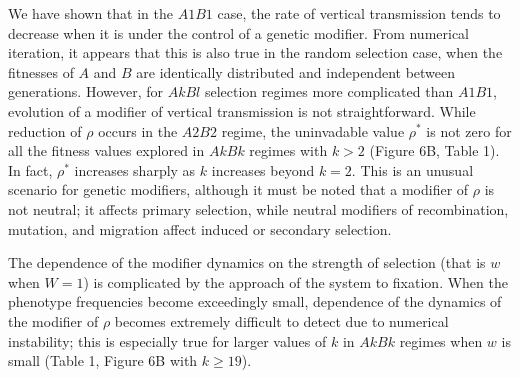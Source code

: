 \documentclass[9pt,twocolumn,twoside,lineno]{pnas-new}
\begin{document}
 We have shown that in the $A1B1$ case, the rate of vertical transmission tends to decrease when it is under the control of a genetic modifier. From numerical iteration, it appears that this is also true in the random selection case, when the fitnesses of $A$ and $B$ are identically distributed and independent between generations. However, for $AkBl$ selection regimes more complicated than $A1B1$, evolution of a modifier of vertical transmission is not straightforward. While reduction of $\rho$ occurs in the $A2B2$ regime, the uninvadable value $\rho^*$ is not zero for all the fitness values explored in $AkBk$ regimes with $k>2$ (Figure 6B, Table 1). In fact, $\rho^*$ increases sharply as $k$ increases beyond $k=2$. This is an unusual scenario for genetic modifiers, although it must be noted that a modifier of $\rho$ is not neutral; it affects primary selection, while neutral  modifiers of recombination, mutation, and migration affect induced or secondary selection.
 
 The dependence of the modifier dynamics on the strength of selection (that is $w$ when $W=1$) is complicated by the approach of the system to fixation. When the phenotype frequencies become exceedingly small, dependence of the dynamics of the modifier of $\rho$ becomes extremely difficult to detect due to numerical instability; this is especially true for larger values of $k$ in $AkBk$ regimes when $w$ is small (Table 1, Figure 6B with $k\ge 19$).
 
\end{document}
